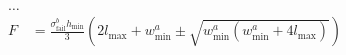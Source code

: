 \begin{align*}
	\dots \\
	F &= \frac{ \sigma^b_\text{fail} h_\text{min} }{ 3 } \left( 2 l_\text{max}  + w^a_\text{min} \pm \sqrt{ w^a_\text{min} \left( w^a_\text{min} + 4 l_\text{max} \right)  } \right) \\
\end{align*}

